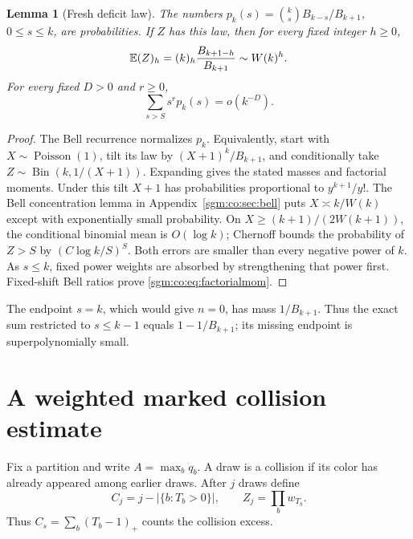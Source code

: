 \documentclass[11pt,letterpaper]{article}
\newtheorem{lemma}[theorem]{Lemma}\newtheorem{proposition}[theorem]{Proposition}\newtheorem{corollary}[theorem]{Corollary}
\theoremstyle{remark}\newtheorem{remark}[theorem]{Remark}
\newcommand{\Poi}{\operatorname{Poisson}}\newcommand{\Bin}{\operatorname{Bin}}
\theoremstyle{definition}\newtheorem{definition}[theorem]{Definition}
\begin{document}
\begin{lemma}[Fresh deficit law]\label{sgm:co:lem:deficit}
The numbers $p_k(s)=\binom ksB_{k-s}/B_{k+1}$, $0\le s\le k$, are probabilities. If $Z$ has this law, then for every fixed integer $h\ge0$,
\begin{equation}\label{sgm:co:eq:factorialmom}
 \mathbb E(Z)_h=(k)_h\frac{B_{k+1-h}}{B_{k+1}}\sim W(k)^h.
\end{equation}
For every fixed $D>0$ and $r\ge0$,
\begin{equation}\label{sgm:co:eq:deficittail}
 \sum_{s>S} s^r p_k(s)=o(k^{-D}).
\end{equation}
\end{lemma}
\begin{proof}
The Bell recurrence normalizes $p_k$. Equivalently, start with $X\sim\Poi(1)$, tilt its law by $(X+1)^k/B_{k+1}$, and conditionally take $Z\sim\Bin(k,1/(X+1))$. Expanding gives the stated masses and factorial moments. Under this tilt $X+1$ has probabilities proportional to $y^{k+1}/y!$. The Bell concentration lemma in Appendix~\ref{sgm:co:sec:bell} puts $X\asymp k/W(k)$ except with exponentially small probability. On $X\ge(k+1)/(2W(k+1))$, the conditional binomial mean is $O(\log k)$; Chernoff bounds the probability of $Z>S$ by $(C\log k/S)^S$. Both errors are smaller than every negative power of $k$. As $s\le k$, fixed power weights are absorbed by strengthening that power first. Fixed-shift Bell ratios prove \eqref{sgm:co:eq:factorialmom}.
\end{proof}
The endpoint $s=k$, which would give $n=0$, has mass $1/B_{k+1}$. Thus the exact sum restricted to $s\le k-1$ equals $1-1/B_{k+1}$; its missing endpoint is superpolynomially small.

\section{A weighted marked collision estimate}\label{sgm:co:sec:marked}
Fix a partition and write $A=\max_bq_b$. A draw is a collision if its color has already appeared among earlier draws. After $j$ draws define
\[
 C_j=j-|\{b:T_b>0\}|,\qquad Z_j=\prod_bw_{T_b}.
\]
Thus $C_s=\sum_b(T_b-1)_+$ counts the collision excess.
\end{document}
